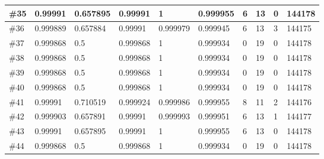 \begin{longtable}{l|l|l|l|l|l|l|l|l|l}
\#35 & 0.99991  & 0.657895 & 0.99991  & 1        & 0.999955 & 6 & 13 & 0 & 144178 \\ \hline
\#36 & 0.999889 & 0.657884 & 0.99991  & 0.999979 & 0.999945 & 6 & 13 & 3 & 144175 \\ \hline
\#37 & 0.999868 & 0.5      & 0.999868 & 1        & 0.999934 & 0 & 19 & 0 & 144178 \\ \hline
\#38 & 0.999868 & 0.5      & 0.999868 & 1        & 0.999934 & 0 & 19 & 0 & 144178 \\ \hline
\#39 & 0.999868 & 0.5      & 0.999868 & 1        & 0.999934 & 0 & 19 & 0 & 144178 \\ \hline
\#40 & 0.999868 & 0.5      & 0.999868 & 1        & 0.999934 & 0 & 19 & 0 & 144178 \\ \hline
\#41 & 0.99991  & 0.710519 & 0.999924 & 0.999986 & 0.999955 & 8 & 11 & 2 & 144176 \\ \hline
\#42 & 0.999903 & 0.657891 & 0.99991  & 0.999993 & 0.999951 & 6 & 13 & 1 & 144177 \\ \hline
\#43 & 0.99991  & 0.657895 & 0.99991  & 1        & 0.999955 & 6 & 13 & 0 & 144178 \\ \hline
\#44 & 0.999868 & 0.5      & 0.999868 & 1        & 0.999934 & 0 & 19 & 0 & 144178 \\ \hline



\end{longtable}

























